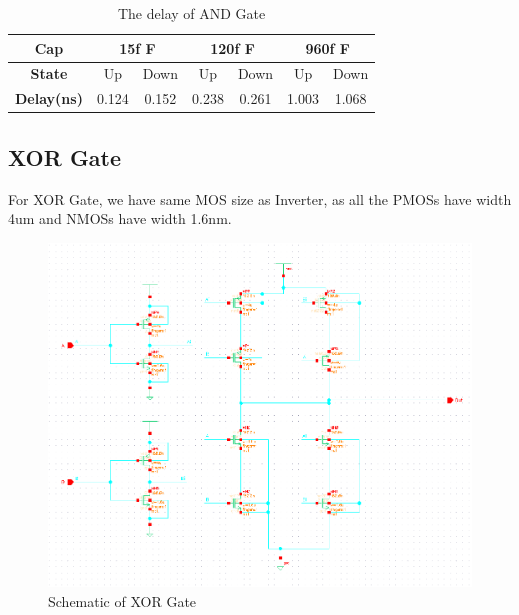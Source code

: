 \documentclass[conference]{IEEEtran}
\begin{document}
\begin{table}[h]
    \caption{The delay of AND Gate}
    \begin{center}
        \begin{tabular}{|c|c|c|c|c|c|c|}
            \hline
            \textbf{Cap} & \multicolumn{2}{|c|}{15f F} & \multicolumn{2}{|c|}{120f F} & \multicolumn{2}{|c|}{960f F} \\
            \hline
            \textbf{State} & Up & Down & Up & Down & Up & Down \\
            \hline
            \textbf{Delay(ns)} & 0.124  & 0.152 & 0.238 & 0.261 & 1.003 & 1.068 \\
            \hline
        \end{tabular}
    \end{center}
    \label{The delay of AND}
\end{table}

\subsection{XOR Gate}

For XOR Gate, we have same MOS size as Inverter, as all the PMOSs have width 4um and NMOSs have width 1.6nm.

\begin{figure}[H]
    \centering
    \includegraphics[width = 0.9\linewidth]{xor2_schematic.png}
    \caption{Schematic of XOR Gate}
    \label{Schematic of XOR Gate}
\end{figure}
\end{document}
